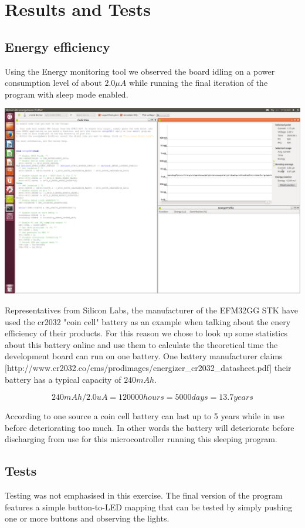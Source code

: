 \chapter{Results and Tests}
\label{chap:results}

\section{Energy efficiency}
Using the Energy monitoring tool we observed the board idling on a power consumption level of about $2.0 \mu A$ while running the final iteration of the program with sleep mode enabled.

\includegraphics[width=\linewidth]{img/eAProfiler.png}

Representatives from Silicon Labs, the manufacturer of the EFM32GG STK have used the cr2032 "coin cell" battery as an example when talking about the enery efficiency of their products. For this reason we chose to look up some statistics about this battery online and use them to calculate the theoretical time the development board can run on one battery. One battery manufacturer claims [http://www.cr2032.co/cms/prodimages/energizer\_cr2032\_datasheet.pdf] their battery has a typical capacity of $240 mAh$.

\[
	240 mAh / 2.0 uA = 120 000 hours = 5000 days = 13.7 years
\]

According to one source \cite{cr2032} a coin cell battery can last up to 5 years while in use before deteriorating too much. In other words the battery will deteriorate before discharging from use for this microcontroller running this sleeping program.

\section{Tests}
Testing was not emphasised in this exercise. The final version of the program features a simple button-to-LED mapping that can be tested by simply pushing one or more buttons and observing the lights.


